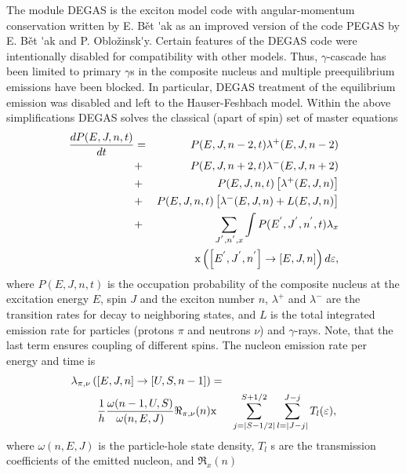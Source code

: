 The module DEGAS%
 is the exciton model code with angular-momentum conservation
written by E. B\v{e}t%
\'{ }ak as an improved version of the code PEGAS \cite{Degas} by E. B\v{e}t%
\'{ }ak and P. Oblo\v{z}insk\'{ }y. Certain features of the DEGAS code were
intentionally disabled for compatibility with other models. 
Thus, $\gamma $-cascade has been limited to primary $\gamma $s in the
composite nucleus and multiple preequilibrium emissions have been blocked.
In particular, DEGAS treatment of the equilibrium emission was disabled and
left to the Hauser-Feshbach%
 model. %
Within the above simplifications DEGAS%
 solves the classical (apart of spin) set of master equations 
\begin{eqnarray}
\frac{dP(E,J,n,t)}{dt} &=&P(E,J,n-2,t)\lambda ^{+}(E,J,n-2)  \notag \\
&+&P(E,J,n+2,t)\lambda ^{-}(E,J,n+2)  \notag \\
&+&P(E,J,n,t)\left[ \lambda ^{+}(E,J,n)\right]  \notag \\
&+&P(E,J,n,t)\left[ \lambda ^{-}(E,J,n)+L(E,J,n)\right]  \notag
\label{mastereq} \\
&+&\sum_{J^{^{\prime }},n^{^{\prime }},x}\int P(E^{^{\prime }},J^{^{\prime
}},n^{^{\prime }},t)\lambda _{x}  \notag \\
&&\text{x}\left( \left[ E^{^{\prime }},J^{^{\prime }},n^{^{\prime }}\right]
\rightarrow \left[ E,J,n\right] \right) d\varepsilon ,
\end{eqnarray}%
\noindent where $P(E,J,n,t)$ is the occupation probability of the composite
nucleus at the excitation energy $E$, spin $J$ and the exciton number $n$, $%
\lambda ^{+}$ and $\lambda ^{-}$ are the transition rates for decay to
neighboring states, and $L$ is the total integrated emission rate for
particles (protons $\pi $ and neutrons $\nu $) and $\gamma $-rays. Note,
that the last term ensures coupling of different spins. The nucleon emission
rate per energy and time is 
\begin{eqnarray}
\lambda _{\pi ,\nu }\left( \left[ E,J,n\right] \rightarrow \left[ U,S,n-1%
\right] \right) &=& \\
\frac{1}{h}\frac{\omega (n-1,U,S)}{\omega (n,E,J)}\Re _{\pi ,\nu }(n) &\text{%
x}&\sum_{j=\mid S-1/2\mid }^{S+1/2}\sum_{l=\mid J-j\mid
}^{J-j}T_{l}(\varepsilon ),  \notag
\end{eqnarray}%
\noindent where $\omega (n,E,J)$ is the particle-hole state density, $T_{l}$%
s are the transmission coefficients of the emitted nucleon, and $\Re _{x}(n)$
